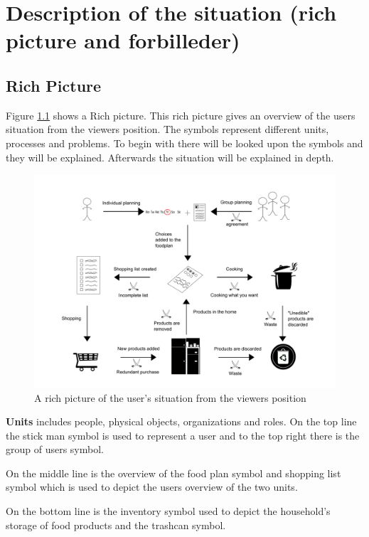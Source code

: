\chapter{Description of the situation (rich picture and forbilleder)}

\section{Rich Picture}
Figure \ref{RigtBillede} shows a Rich picture. This rich picture gives an overview of the users situation from the viewers position. The symbols represent different units, processes and problems. To begin with there will be looked upon the symbols and they will be explained. Afterwards the situation will be explained in depth.

  \begin{figure}[H]
	\centering
	\includegraphics[width=1.00\textwidth]{Grafik/FoodPlanner/InkscapeTegninger/RigtBillede.pdf}
	\caption{A rich picture of the user's situation from the viewers position}
	\label{RigtBillede}
\end{figure}
\textbf{Units} includes people, physical objects, organizations and roles. On the top line the stick man symbol is used to represent a user and to the top right there is the group of users symbol. 

On the middle line is the overview of the food plan symbol and shopping list symbol which is used to depict the users overview of the two units. 

On the bottom line is the inventory symbol used to depict the household's storage of food products and the trashcan symbol.    

